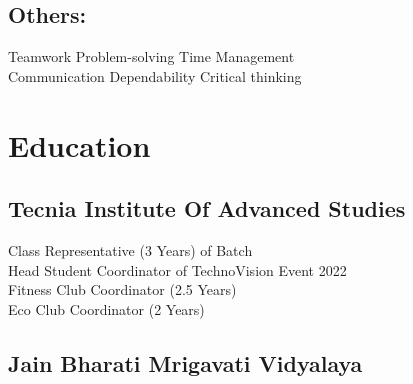 \documentclass[]{deedy-resume-openfont}
\begin{document}
\begin{minipage}[t]{0.4\textwidth}
\subsection{Others:}
\sectionsep
Teamwork \textbullet{} Problem-solving \textbullet{} Time Management\\ Communication \textbullet{} Dependability \textbullet{} Critical thinking
\sectionsep

\section{Education} 

\subsection{Tecnia Institute Of Advanced Studies}
Class Representative (3 Years) of Batch\\
Head Student Coordinator of TechnoVision Event 2022\\
Fitness Club Coordinator (2.5 Years)\\
Eco Club Coordinator (2 Years)\\
\sectionsep

\subsection{Jain Bharati Mrigavati Vidyalaya}
\sectionsep






\end{minipage}
\end{document}
